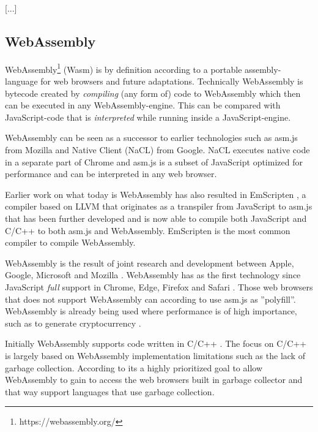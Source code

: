 [...]

\subsection{WebAssembly}

WebAssembly\footnote{https://webassembly.org/} (Wasm) is by definition according to \textcite{HaasRossbergSchuffTitzerHolmanGohmanWagnerZakaiBastien2017} a portable assembly-language for web browsers and future adaptations. Technically WebAssembly is bytecode created by \emph{compiling} (any form of) code to WebAssembly \parencite{Watt2018} which then can be executed in any WebAssembly-engine. This can be compared with JavaScript-code that is \emph{interpreted} while running inside a JavaScript-engine.

WebAssembly can be seen as a successor to earlier technologies such as asm.js from Mozilla and Native Client (NaCL) from Google. NaCL executes native code in a separate part of Chrome and asm.js  \parencite{Zakai2018} is a subset of JavaScript optimized for performance \parencite{VanEsNicolayStievenartDHondtDeRoover2016} and can be interpreted in any web browser.

Earlier work on what today is WebAssembly has also resulted in EmScripten \parencite{Zakai2011}, a compiler based on LLVM \parencite{LattnerAdve2014} that originates as a transpiler from JavaScript to asm.js \parencite{Zakai2011} that has been further developed \parencite{HaasRossbergSchuffTitzerHolmanGohmanWagnerZakaiBastien2017} and is now able to compile both JavaScript and C/C++ to both asm.js and WebAssembly. EmScripten is the most common compiler to compile WebAssembly.

WebAssembly is the result of joint research and development between Apple, Google, Microsoft and Mozilla \parencite{HaasRossbergSchuffTitzerHolmanGohmanWagnerZakaiBastien2017}. WebAssembly has as the first technology since JavaScript \emph{full} support in Chrome, Edge, Firefox and Safari \parencite{Moller2018}. Those web browsers that does not support WebAssembly can according to \textcite{HaasRossbergSchuffTitzerHolmanGohmanWagnerZakaiBastien2017} use asm.js as ''polyfill''. WebAssembly is already being used where performance is of high importance, such as to generate cryptocurrency \parencite{RuthZimmermannWolsingHohlfeld2018}.

Initially WebAssembly supports code written in C/C++ \parencite{HaasRossbergSchuffTitzerHolmanGohmanWagnerZakaiBastien2017}. 
The focus on C/C++ is largely based on WebAssembly implementation limitations such as the lack of garbage collection. According to \textcite{HaasRossbergSchuffTitzerHolmanGohmanWagnerZakaiBastien2017} its a highly prioritized goal to allow WebAssembly to gain to access the web browsers built in garbage collector and that way support languages that use garbage collection.

